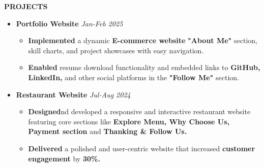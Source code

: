 \documentclass[a4paper,10pt]{article}
\newcommand{\resheading}[1]{{\small \colorbox{mygrey}{\begin{minipage}{0.975\textwidth}{\textbf{#1 \vphantom{p\^{E}}}}\end{minipage}}}}
\begin{document}
\resheading{\textbf{PROJECTS} }



\begin{itemize}


\item {\bf Portfolio Website} 
\textit{\hfill 
{Jan-Feb 2025}
}



\begin{itemize}

\vspace{-1.5mm}
\item \textbf{Implemented } a dynamic \textbf{E-commerce website} \textbf{"About Me" }section, skill charts, and project showcases with easy navigation.

\item \textbf{Enabled} resume download functionality and embedded links to  \textbf{GitHub, LinkedIn,} and other social platforms in the \textbf{"Follow Me"} section.


\vspace{-1mm}

\end{itemize}
\end{itemize}



\begin{itemize}

 
 
\item {\bf Restaurant Website} 
\textit{\hfill 
{Jul-Aug 2024}
}

\begin{itemize}

\vspace{-1.5mm}

\item \textbf{Designed}nd developed a responsive and interactive restaurant website featuring core sections like  \textbf{Explore Menu, Why Choose Us, Payment section} and  \textbf{Thanking \& Follow Us.} 

\item  \textbf{Delivered} a polished and user-centric website that increased  \textbf{customer engagement} by  \textbf{30\%.} 


\vspace{-2mm}
\end{itemize}
\end{itemize}
\end{document}

